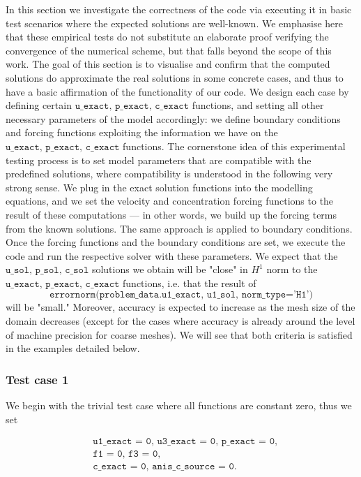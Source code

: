 \documentclass[12pt]{report}
\numberwithin{theorem}{chapter}
\numberwithin{corollary}{chapter}
\numberwithin{lemma}{chapter}
\numberwithin{remark}{chapter}
\numberwithin{definition}{chapter}
\numberwithin{prop}{chapter}
\begin{document}
In this section we investigate the correctness of the code via executing it in basic test scenarios where the expected solutions are well-known. We emphasise here that these empirical tests do not substitute an elaborate proof verifying the convergence of the numerical scheme, but that falls beyond the scope of this work. The goal of this section is to visualise and confirm that the computed solutions do approximate the real solutions in some concrete cases, and thus to have a basic affirmation of the functionality of our code.
We design each case by defining certain $\texttt{u\_exact, p\_exact, c\_exact}$ functions, and setting all other necessary parameters of the model accordingly: we define boundary conditions and forcing functions exploiting the information we have on the $\texttt{u\_exact, p\_exact,}$ $\texttt{c\_exact}$ functions. The cornerstone idea of this experimental testing process is to set model parameters that are compatible with the predefined solutions, where compatibility is understood in the following very strong sense. We plug in the exact solution functions into the modelling equations, and we set the velocity and concentration forcing functions to the result of these computations --- in other words, we build up the forcing terms from the known solutions. The same approach is applied to boundary conditions. Once the forcing functions and the boundary conditions are set, we execute the code and run the respective solver with these parameters. We expect that the $\texttt{u\_sol, p\_sol, c\_sol}$ solutions we obtain will be "close" in $H^1$ norm to the $\texttt{u\_exact, p\_exact, c\_exact}$ functions, i.e. that the result of
%
$$\texttt{errornorm(problem\_data.u1\_exact, u1\_sol, norm\_type='H1')}$$
%
will be "small." Moreover, accuracy is expected to increase as the mesh size of the domain decreases (except for the cases where accuracy is already around the level of machine precision for coarse meshes). We will see that both criteria is satisfied in the examples detailed below.

\subsubsection{Test case 1}

We begin with the trivial test case where all functions are constant zero, thus we set

\begin{equation}
  \begin{split}
    & \texttt{u1\_exact = 0, u3\_exact = 0, p\_exact = 0}, \\
    & \texttt{f1 = 0, f3 = 0}, \\
    & \texttt{c\_exact = 0, anis\_c\_source = 0.}
  \end{split}
\end{equation}
\end{document}
